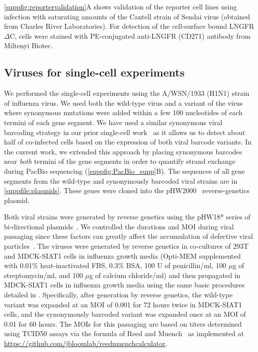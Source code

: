 \documentclass[10pt,letterpaper]{article}
\newcommand{\SUPPFILE}[1]{\autoref{suppfile:#1}}
\newcommand{\SUPPFIG}[1]{\autoref{suppfig:#1}}
\begin{document}
\SUPPFIG{reportervalidation}A shows validation of the reporter cell lines using infection with saturating amounts of the Cantell strain of Sendai virus (obtained from Charles River Laboratories).
For detection of the cell-surface bound LNGFR$\Delta$C, cells were stained with PE-conjugated anti-LNGFR (CD271) antibody from Miltenyi Biotec.

\subsection*{Viruses for single-cell experiments}
We performed the single-cell experiments using the A/WSN/1933 (H1N1) strain of influenza virus.
We used both the wild-type virus and a variant of the virus where synonymous mutations were added within a few 100 nucleotides of each termini of each gene segment.
We have used a similar synonymous viral barcoding strategy in our prior single-cell work~\citep{russell2018extreme} as it allows us to detect about half of co-infected cells based on the expression of both viral barcode variants.
In the current work, we extended this approach by placing synonymous barcodes near \emph{both} termini of the gene segments in order to quantify strand exchange during PacBio sequencing (\SUPPFIG{PacBio_supp}B).
The sequences of all gene segments from the wild-type and synonymously barcoded viral strains are in \SUPPFILE{plasmids}.
These genes were cloned into the pHW2000~\citep{hoffmann2000dna} reverse-genetics plasmid.

Both viral strains were generated by reverse genetics using the pHW18* series of bi-directional plasmids~\citep{hoffmann2000dna}.
We controlled the durations and MOI during viral passaging since these factors can greatly affect the accumulation of defective viral particles~\citep{xue2016propagation}.
The viruses were generated by reverse genetics in co-cultures of 293T and MDCK-SIAT1 cells in influenza growth media (Opti-MEM supplemented with 0.01\% heat-inactivated FBS, 0.3\% BSA, 100 U of penicillin/ml, 100 $\mu$g of streptomycin/ml, and 100 $\mu$g of calcium chloride/ml) and then propagated in MDCK-SIAT1 cells in influenza growth media using the same basic procedures detailed in \citep{russell2018extreme}.
Specifically, after generation by reverse genetics, the wild-type variant was expanded at an MOI of 0.001 for 72 hours twice in MDCK-SIAT1 cells, and the synonymously barcoded variant was expanded once at an MOI of 0.01 for 60 hours.
The MOIs for this passaging are based on titers determined using TCID50 assays via the formula of Reed and Muench~\citep{reed1938simple} as implemented at \url{https://github.com/jbloomlab/reedmuenchcalculator}.
\end{document}

